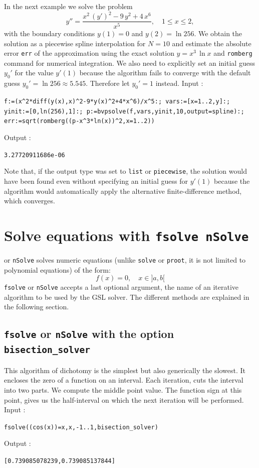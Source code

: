 \documentclass[a4paper,11pt]{book}
\begin{document}
In the next example we solve the problem
\[ y''=\frac{x^2\,(y')^2-9\,y^2+4\,x^6}{x^5},\quad 1\leq x\leq 2, \]
with the boundary conditions $y(1)=0$ and $y(2)=\ln 256$. We obtain the solution as a piecewise spline interpolation for $N=10$ and estimate the absolute error {\tt err} of the approximation using the exact solution $y=x^3\,\ln x$ and {\tt romberg} command for numerical integration. We also need to explicitly set an initial guess $y_0'$ for the value $y'(1)$ because the algorithm fails to converge with the default guess $y_0'=\ln 256\approx 5.545$. Therefore let $y_0'=1$ instead. Input :
\begin{center}
  \tt f:=(x\verb|^|2*diff(y(x),x)\verb|^|2-9*y(x)\verb|^|2+4*x\verb|^|6)/x\verb|^|5:; vars:=[x=1..2,y]:; yinit:=[0,ln(256),1]:; p:=bvpsolve(f,vars,yinit,10,output=spline):; err:=sqrt(romberg((p-x\verb|^|3*ln(x))\verb|^|2,x=1..2))
\end{center}
Output :
\begin{center}
  \tt 3.27720911686e-06
\end{center}
Note that, if the output type was set to {\tt list} or {\tt piecewise}, the solution would have been found even without specifying an initial guess for $y'(1)$ because the algorithm would automatically apply the alternative finite-difference method, which converges.

\section{Solve equations with {\tt fsolve nSolve}}
 or {\tt nSolve} solves numeric equations
(unlike {\tt solve} or {\tt proot}, it is not limited to polynomial 
equations) of the form:
\[ f(x)=0, \quad x \in ]a,b[ \]
{\tt fsolve} or {\tt nSolve} accepts a last optional argument,
the name of an iterative algorithm to be used by the GSL solver.
The different methods are explained in the following section.

\subsection{{\tt fsolve} or {\tt nSolve} with the option {\tt bisection\_solver}}
This algorithm of dichotomy is the simplest but also generically
the slowest. 
It encloses the zero of a function on an interval. 
Each iteration, cuts the interval into two parts. We compute the middle point 
value. The function sign at this point, gives us the half-interval 
on which the next iteration will be performed.\\
Input :
\begin{center}{\tt fsolve((cos(x))=x,x,-1..1,bisection\_solver)}\end{center}
Output :
\begin{center}{\tt [0.739085078239,0.739085137844]}\end{center}
\end{document}
